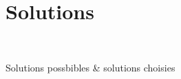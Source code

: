\chapter*{Solutions}
\thispagestyle{plain}
~\\[1cm]
{ \large
Solutions possbibles & solutions choisies

}
